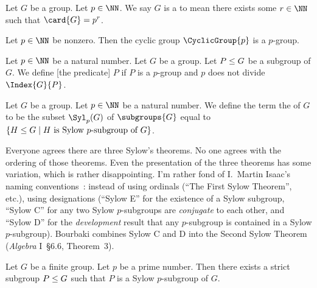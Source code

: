 \begin{definition}[P-groups]
Let $G$ be a group. Let $p\in\NN$.
We say $G$ is a  to mean there exists some $r\in\NN$
such that $\card{G}=p^{r}$.
\end{definition}

\begin{example}
Let $p\in\NN$ be nonzero.
Then the cyclic group $\CyclicGroup{p}$ is a $p$-group.
\end{example}

\begin{definition}
Let $p\in\NN$ be a natural number. Let $G$ be a group. Let $P\leq G$
be a subgroup of $G$. We define [the predicate] $P$ 
if $P$ is a $p$-group and $p$ does not divide $\Index{G}{P}$.
\end{definition}

\begin{definition}
Let $G$ be a group. Let $p\in\NN$ be a natural number.
We define the term the  of $G$
to be the subset $\Syl_{p}(G)$ of $\subgroups{G}$ equal to
$\{H\subgroup G\mid H\mbox{ is Sylow $p$-subgroup of }G\}$.
\end{definition}

\begin{remark}
Everyone agrees there are three Sylow's theorems. No one agrees with
the ordering of those theorems. Even the presentation of the three
theorems has some variation, which is rather disappointing. I'm rather
fond of I.~Martin Isaac's naming conventions~\cite{isaacs2008finite}: instead of using
ordinals (``The First Sylow Theorem'', etc.), using designations
(``Sylow E'' for the existence of a Sylow subgroup, %
``Sylow C'' for any two Sylow $p$-subgroups are \emph{conjugate} to
each other,  %
and ``Sylow D'' for the \emph{development} result that any
$p$-subgroup is contained in a Sylow $p$-subgroup). %
Bourbaki combines Sylow C and D into the Second Sylow Theorem
(\textit{Algebra} I~\S6.6, Theorem~3).
\end{remark}

\begin{theorem}
Let $G$ be a finite group.
Let $p$ be a prime number.
Then there exists a strict subgroup $P\leq G$ such that $P$ is a
Sylow $p$-subgroup of $G$.
\end{theorem}


